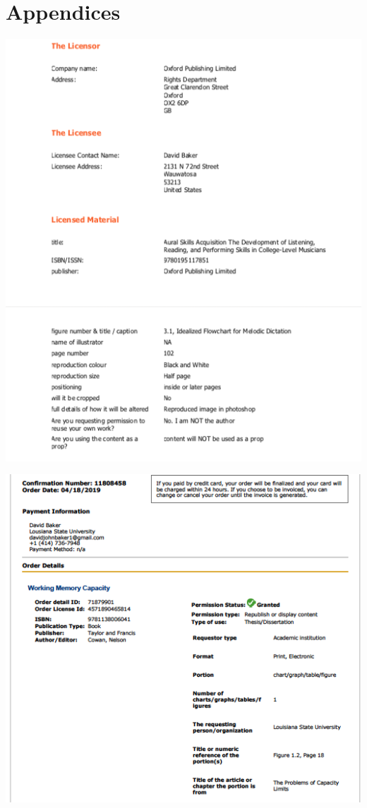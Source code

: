 \backmatter
\chapter{Appendices}

\thispagestyle{empty}
\begin{center}
\includegraphics{karpinskipermission.png}
\end{center}

\thispagestyle{empty}
\begin{center}
\includegraphics{cownpermission.png}
\end{center}

